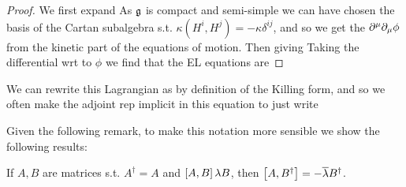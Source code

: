 \documentclass{article}
\begin{document}
\begin{proof}
	We first expand 
As $\mf{g}$ is compact and semi-simple we can have chosen the basis of the Cartan subalgebra s.t. $\kappa(H^i,H^j) = -\kappa \delta^{ij}$, and so we get the $\del^\mu \del_\mu \phi$ from the kinetic part of the equations of motion. Then 
giving 
Taking the differential wrt to $\phi$ we find that the EL equations are 
\end{proof}

\begin{remark}
	We can rewrite this Lagrangian as
by definition of the Killing form, and so we often make the adjoint rep implicit in this equation to just write 
\end{remark}

Given the following remark, to make this notation more sensible we show the following results:

\begin{lemma}
If $A,B$ are matrices s.t. $A^\dagger=A$ and $\comm[A]{B} \lambda B$, then $\comm[A]{B^\dagger} = - \bar{\lambda} B^\dagger$. 	
\end{lemma}
\end{document}
